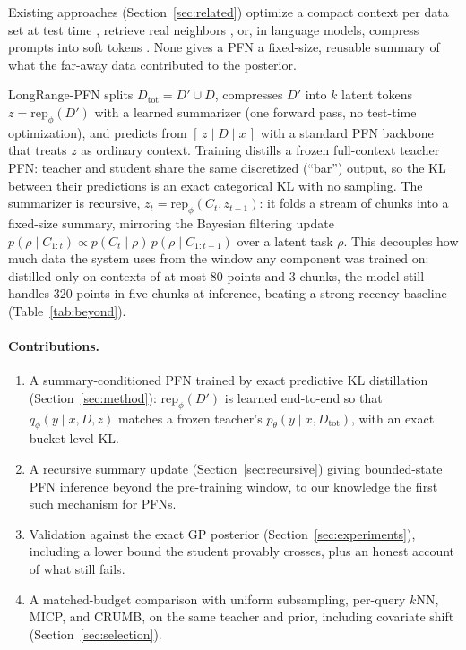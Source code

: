 \documentclass{article}
\newcommand{\Dtot}{D_{\mathrm{tot}}}
\newcommand{\Dfar}{D'}
\newcommand{\Dloc}{D}
\newcommand{\rep}{\mathrm{rep}}
\begin{document}
Existing approaches (Section~\ref{sec:related}) optimize a compact context per
data set at test time \citep{feuer2024tunetables, ma2024icd}, retrieve real
neighbors \citep{thomas2024localpfn}, or, in language models, compress prompts
into soft tokens \citep{mu2023gisting, ge2023icae, chevalier2023autocompressors}.
None gives a PFN a fixed-size, reusable summary of what the far-away data
contributed to the posterior.

LongRange-PFN splits $\Dtot = \Dfar \cup \Dloc$, compresses $\Dfar$ into $k$
latent tokens $z = \rep_\phi(\Dfar)$ with a learned summarizer (one forward
pass, no test-time optimization), and predicts from $[\,z \mid \Dloc \mid x\,]$
with a standard PFN backbone that treats $z$ as ordinary context. Training
distills a frozen full-context teacher PFN: teacher and student share the same
discretized (``bar'') output, so the KL between their predictions is an exact
categorical KL with no sampling. The summarizer is recursive,
$z_t = \rep_\phi(C_t, z_{t-1})$: it folds a stream of chunks into a fixed-size
summary, mirroring the Bayesian filtering update
$p(\rho \mid C_{1:t}) \propto p(C_t \mid \rho)\, p(\rho \mid C_{1:t-1})$ over a
latent task $\rho$. This decouples how much data the system uses from the
window any component was trained on: distilled only on contexts of at most
$80$ points and $3$ chunks, the model still handles $320$ points in five chunks
at inference, beating a strong recency baseline (Table~\ref{tab:beyond}).

\paragraph{Contributions.}
\begin{enumerate}
  \item A summary-conditioned PFN trained by exact predictive KL distillation
  (Section~\ref{sec:method}): $\rep_\phi(\Dfar)$ is learned end-to-end so that
  $q_\phi(y \mid x, \Dloc, z)$ matches a frozen teacher's
  $p_\theta(y \mid x, \Dtot)$, with an exact bucket-level KL.
  \item A recursive summary update (Section~\ref{sec:recursive}) giving
  bounded-state PFN inference beyond the pre-training window, to our knowledge
  the first such mechanism for PFNs.
  \item Validation against the exact GP posterior
  (Section~\ref{sec:experiments}), including a lower bound the student provably
  crosses, plus an honest account of what still fails.
  \item A matched-budget comparison with uniform subsampling, per-query $k$NN,
  MICP, and CRUMB, on the same teacher and prior, including covariate shift
  (Section~\ref{sec:selection}).
\end{enumerate}
\end{document}
